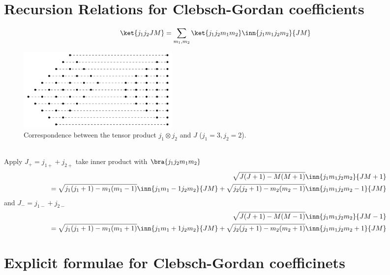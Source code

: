 \documentclass{article}
\begin{document}
\section{Recursion Relations for Clebsch-Gordan coefficients}
\label{sec-3}
\begin{equation}
\label{}
\ket{j_1j_2 JM} = \sum_{m_1,m_2} \ket{j_1 j_2m_1m_2}\inn{j_1 m_1j_2m_2}{JM}
\end{equation}
\begin{figure}[htb]
\centering
\includegraphics[width=80mm]{./images/j_grids.png}
\caption{\label{fig:j-grids}Correspondence between the tensor product $j_{1}\otimes j_{2}$ and $J$ ($j_{1}=3,j_{2}=2$).}
\end{figure}\\
Apply $J_+ = j_{1+} + j_{2+}$ take inner product with $\bra{j_1j_2m_1m_2}$
\begin{eqnarray}
&&\sqrt{J(J+1) - M(M+1)}\inn{j_1 m_1j_2m_2}{JM+1}  \nonumber\\
&&=  \sqrt{j_1(j_1+1) - m_1(m_1-1)}\inn{j_1 m_1-1j_2m_2}{JM} +   \sqrt{j_2(j_2+1) - m_2(m_2-1)}\inn{j_1 m_1j_2m_2-1}{JM}\nonumber\\
\end{eqnarray}
and $J_- = j_{1-} + j_{2-}$ 
\begin{eqnarray}
&&\sqrt{J(J+1) - M(M-1)}\inn{j_1 m_1j_2m_2}{JM-1}  \nonumber\\
&&=  \sqrt{j_1(j_1+1) - m_1(m_1+1)}\inn{j_1 m_1+1j_2m_2}{JM} +   \sqrt{j_2(j_2+1) - m_2(m_2+1)}\inn{j_1 m_1j_2m_2+1}{JM}\nonumber\\
\end{eqnarray}

\section{Explicit formulae for Clebsch-Gordan coefficinets}
\label{sec-4}
\end{document}
